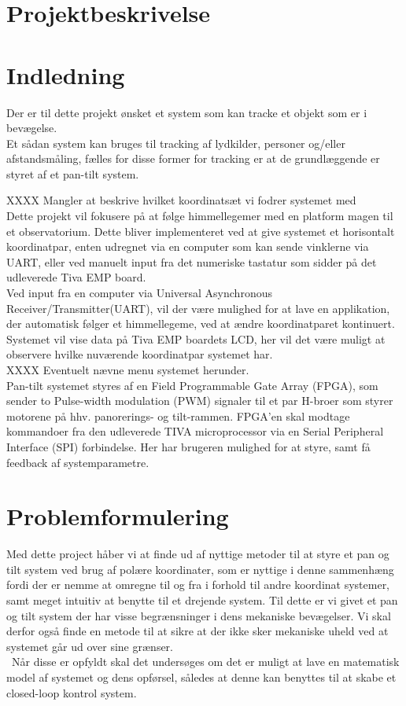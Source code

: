 \section{Projektbeskrivelse}

\section{Indledning}
Der er til dette projekt ønsket et system som kan tracke et objekt som er i bevægelse.\\
Et sådan system kan bruges til tracking af lydkilder, personer og/eller afstandsmåling, fælles for disse former for tracking er at de grundlæggende er styret af et pan-tilt system.

XXXX Mangler at beskrive hvilket koordinatsæt vi fodrer systemet med\\
Dette projekt vil fokusere på at følge himmellegemer med en platform magen til et observatorium. Dette bliver implementeret ved at give systemet et horisontalt koordinatpar, enten udregnet via en computer som kan sende vinklerne via UART, eller ved manuelt input fra det numeriske tastatur som sidder på det udleverede Tiva EMP board.\\
Ved input fra en computer via Universal Asynchronous Receiver/Transmitter(UART), vil der være mulighed for at lave en applikation, der automatisk følger et himmellegeme, ved at ændre koordinatparet kontinuert.
Systemet vil vise data på Tiva EMP boardets LCD, her vil det være muligt at observere hvilke nuværende koordinatpar systemet har.\\
XXXX Eventuelt nævne menu systemet herunder.\\

Pan-tilt systemet styres af en Field Programmable Gate Array (FPGA), som sender to Pulse-width modulation (PWM) signaler til et par H-broer som styrer motorene på hhv. panorerings- og tilt-rammen.
FPGA’en skal modtage kommandoer fra den udleverede TIVA microprocessor via en Serial Peripheral Interface (SPI) forbindelse.
Her har brugeren mulighed for at styre, samt få feedback af systemparametre.

\section{Problemformulering}
Med dette project håber vi at finde ud af nyttige metoder til at styre et pan og tilt system ved brug af polære koordinater, som er nyttige i denne sammenhæng fordi der er nemme at omregne til og fra i forhold til andre koordinat systemer, samt meget intuitiv at benytte til et drejende system. Til dette er vi givet et pan og tilt system der har visse begrænsninger i dens mekaniske bevægelser. Vi skal derfor også finde en metode til at sikre at der ikke sker mekaniske uheld ved at systemet går ud over sine grænser.
\\\
Når disse er opfyldt skal det undersøges om det er muligt at lave en matematisk model af systemet og dens opførsel, således at denne kan benyttes til at skabe et closed-loop kontrol system.\\


